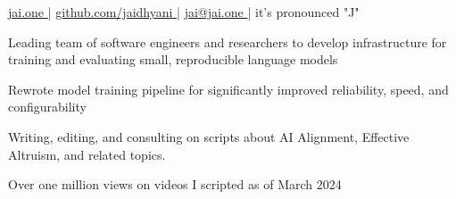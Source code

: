 \documentclass[]{resume}
\begin{document}
%
%
\lastupdated
\github

%
%
{ 
    \href{http://jai.one }{jai.one }|
    \href{http://github.com/jaidhyani}{ github.com/jaidhyani }|
    \href{mailto:jai@jai.one}{ jai@jai.one }|
    it's pronounced "J"
}

%
%



%
%


\hfill
\begin{minipage}[t]{1.0\textwidth}






\vspace{\topsep} %

\begin{tightemize}
    \item Leading team of software engineers and researchers to develop infrastructure for training and evaluating small, reproducible  language models
    \item Rewrote model training pipeline for significantly improved reliability, speed, and configurability
\end{tightemize}

\begin{tightemize}
    \item Writing, editing, and consulting on scripts about AI Alignment, Effective Altruism, and related topics.
    \columnbreak
    \item Over one million views on videos I scripted as of March 2024
\end{tightemize}


\end{minipage}
\end{document}
